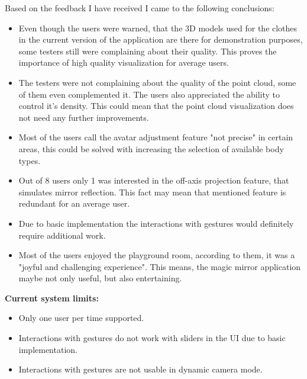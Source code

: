 \documentclass[a4paper]{report}
\begin{document}
    \qquad Based on the feedback I have received I came to the following conclusions:
    \begin{itemize}
    \item Even though the users were warned, that the 3D models used for the clothes in the current version of the application are there for demonstration purposes, some testers still were complaining about their quality. This proves the importance of high quality visualization for average users. 
    
    \item The testers were not complaining about the quality of the point cloud, some of them even complemented it. The users also appreciated the ability to control it's density. This could mean that the point cloud visualization does not need any further improvements.
    
    \item Most of the users call the avatar adjustment feature "not precise" in certain areas, this could be solved with increasing the selection of available body types.
    
    \item Out of 8 users only 1 was interested in the off-axis projection feature, that simulates mirror reflection. This fact may mean that mentioned feature is redundant for an average user.
   
   \item Due to basic implementation the interactions with gestures would definitely require additional work.

   \item Most of the users enjoyed the playground room, according to them, it was a "joyful and challenging experience". This means, the magic mirror application maybe not only useful, but also entertaining. 

    \end{itemize}
    
    \textbf{Current system limits:}
    \begin{itemize}
    \item Only one user per time supported.
    \item Interactions with gestures do not work with sliders in the UI due to basic implementation.
    \item Interactions with gestures are not usable in dynamic camera mode.
    
    \end{itemize}
    
     \newpage
\end{document}
